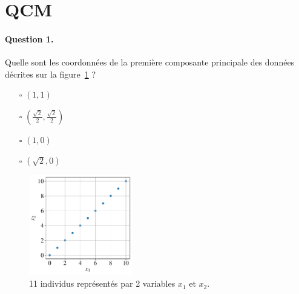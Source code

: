 \section{QCM}

\paragraph{Question 1.} Quelle sont les coordonnées de la première composante principale des données décrites sur la figure~\ref{fig:pca_2d} ?
\begin{itemize}
\item[$\square$] $(1, 1)$
\item[$\square$] $\left(\frac{\sqrt{2}}{2}, \frac{\sqrt{2}}{2}\right)$
\item[$\square$] $(1, 0)$
\item[$\square$] $(\sqrt{2}, 0)$ 
\end{itemize}

\vspace{-160pt}
\begin{figure}[h]
  \centering
  \includegraphics[width=0.4\textwidth]{figures/pca_2d}
  \caption{11 individus représentés par 2 variables $x_1$ et $x_2$.}
  \label{fig:pca_2d}
\end{figure}




